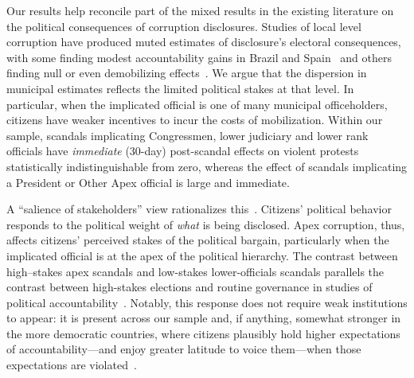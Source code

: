 \documentclass[11pt]{article}
\begin{document}
Our results help reconcile part of the mixed results in the existing literature on the political consequences of corruption disclosures. Studies of local level corruption have produced muted estimates of disclosure's electoral consequences, with some finding modest accountability gains in Brazil and Spain~\citep{ferraz2008exposing,ferraz2011electoral,ferraz2018audits,costasperez2012corruption} and others finding null or even demobilizing effects~\citep{chong2015does,anduiza2013turning,pavao2018corruption,horacio2022metaketa}. We argue that the dispersion in municipal estimates reflects the limited political stakes at that level. In particular, when the implicated official is one of many municipal officeholders, citizens have weaker incentives to incur the costs of mobilization. Within our sample, scandals implicating Congressmen, lower judiciary and lower rank officials have \emph{immediate} (30-day) post-scandal effects on violent protests statistically indistinguishable from zero, whereas the effect of scandals implicating a President or Other Apex official is large and immediate.

A ``salience of stakeholders'' view rationalizes this~\citep{acemoglu2006origins,acemoglu2012nations,jha2013trade,jha2019valuing,jha2022markets}. Citizens' political behavior responds to the political weight of \textit{what} is being disclosed. Apex corruption, thus, affects citizens' perceived stakes of the political bargain, particularly when the implicated official is at the apex of the political hierarchy. The contrast between high--stakes apex scandals and low-stakes lower-officials scandals parallels the contrast between high-stakes elections and routine governance in studies of political accountability~\citep{martinezbravo2022elites}. Notably, this response does not require weak institutions to appear: it is present across our sample and, if anything, somewhat stronger in the more democratic countries, where citizens plausibly hold higher expectations of accountability---and enjoy greater latitude to voice them---when those expectations are violated~\citep{acemoglu2019DemoEcoGrowth,acemoglu2024demobreedsupport,DuranteFutbol}.
\end{document}
